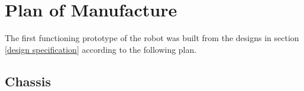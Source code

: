 
\chapter{Plan of Manufacture}\label{manufacture plan}\label{section \thechapter}
The first functioning prototype of the \SandE robot was built from the designs in section \ref{design specification} according to the following plan.

\begin{multicols}{2}
\begin{enumerate}

    \section{Chassis}


\end{enumerate}
\end{multicols}

